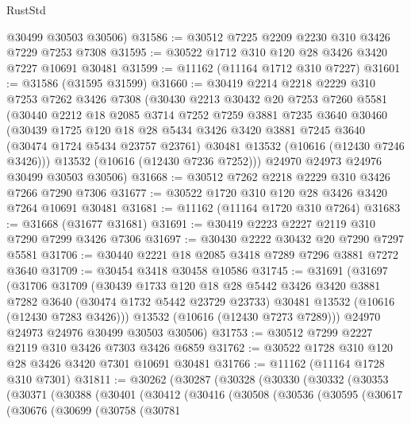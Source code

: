 \begin{lexlean}{RustStd}
\begin{coremodule}
      @30499
      @30503
      @30506)
@31586 := @30512 @7225 @2209 @2230 @310 @3426 @7229 @7253 @7308
@31595 := @30522 @1712 @310 @120 @28 @3426 @3420 @7227 @10691 @30481
@31599 := @11162 (@11164 @1712 @310 @7227)
@31601 := @31586 (@31595 @31599)
@31660 := @30419
    @2214
    @2218
    @2229
    @310
    @7253
    @7262
    @3426
    @7308
    (@30430
      @2213
      @30432
      @20
      @7253
      @7260
      @5581
      (@30440
        @2212
        @18
        @2085
        @3714
        @7252
        @7259
        @3881
        @7235
        @3640
        @30460
        (@30439
          @1725
          @120
          @18
          @28
          @5434
          @3426
          @3420
          @3881
          @7245
          @3640
          (@30474 @1724 @5434 @23757 @23761)
          @30481
          @13532
          (@10616 (@12430 @7246 @3426)))
        @13532
        (@10616 (@12430 @7236 @7252)))
      @24970
      @24973
      @24976
      @30499
      @30503
      @30506)
@31668 := @30512 @7262 @2218 @2229 @310 @3426 @7266 @7290 @7306
@31677 := @30522 @1720 @310 @120 @28 @3426 @3420 @7264 @10691 @30481
@31681 := @11162 (@11164 @1720 @310 @7264)
@31683 := @31668 (@31677 @31681)
@31691 := @30419 @2223 @2227 @2119 @310 @7290 @7299 @3426 @7306
@31697 := @30430 @2222 @30432 @20 @7290 @7297 @5581
@31706 := @30440 @2221 @18 @2085 @3418 @7289 @7296 @3881 @7272 @3640
@31709 := @30454 @3418 @30458 @10586
@31745 := @31691
    (@31697
      (@31706
        @31709
        (@30439
          @1733
          @120
          @18
          @28
          @5442
          @3426
          @3420
          @3881
          @7282
          @3640
          (@30474 @1732 @5442 @23729 @23733)
          @30481
          @13532
          (@10616 (@12430 @7283 @3426)))
        @13532
        (@10616 (@12430 @7273 @7289)))
      @24970
      @24973
      @24976
      @30499
      @30503
      @30506)
@31753 := @30512 @7299 @2227 @2119 @310 @3426 @7303 @3426 @6859
@31762 := @30522 @1728 @310 @120 @28 @3426 @3420 @7301 @10691 @30481
@31766 := @11162 (@11164 @1728 @310 @7301)
@31811 := @30262
    (@30287
      (@30328
        (@30330
          (@30332
            (@30353
              (@30371
                (@30388
                  (@30401
                    (@30412
                      (@30416
                        (@30508
                          (@30536
                            (@30595
                              (@30617
                                (@30676
                                  (@30699
                                    (@30758
                                      (@30781

\end{coremodule}
\end{lexlean}
